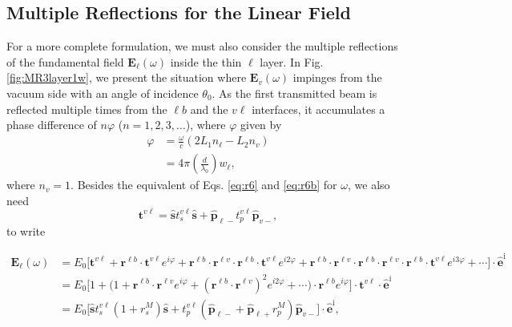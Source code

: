\documentclass[aps,prb,10pt,showpacs,letterpaper,twocolumn]{revtex4-1}
\begin{document}
\subsection{Multiple Reflections for the Linear Field}\label{sec:multiple1w}

For a more complete formulation, we must also consider the multiple reflections
of the fundamental field $\mathbf{E}_{\ell}(\omega)$ inside the thin $\ell$
layer. In Fig. \ref{fig:MR3layer1w}, we present the situation where
$\mathbf{E}_{v}(\omega)$ impinges from the vacuum side with an angle of
incidence $\theta_{0}$. As the first transmitted beam is reflected multiple
times from the $\ell b$ and the $v\ell$ interfaces, it accumulates a phase
difference of $n\varphi$ ($n=1,2,3,\ldots$), where $\varphi$ given by
\begin{equation}\label{mphi}
\begin{split}
\varphi &= \frac{\omega}{c}(2L_{1}n_{\ell} - L_{2}n_{v})\\
&= 4\pi\left(\frac{d}{\lambda_{0}}\right)w_{\ell},
\end{split}
\end{equation}
where $n_{v} = 1$. Besides the equivalent of Eqs. \eqref{eq:r6} and
\eqref{eq:r6b} for $\omega$, we also need
\begin{equation}\label{eq:mvv}
\mathbf{t}^{v\ell}
= \hat{\mathbf{s}}t_{s}^{v\ell}\hat{\mathbf{s}} 
+ \hat{\mathbf{p}}_{\ell -}t_{p}^{v\ell}\hat{\mathbf{p}}_{v-},
\end{equation}
to write
\begin{widetext}
\begin{equation}\label{eq:mcvew}
\begin{split}
\mathbf{E}_\ell(\omega)
&= E_{0}
\Big[
\mathbf{t}^{v\ell} + \mathbf{r}^{\ell b}\cdot\mathbf{t}^{v\ell}e^{i\varphi}
 + \mathbf{r}^{\ell b}\cdot\mathbf{r}^{\ell v}\cdot
   \mathbf{r}^{\ell b}\cdot\mathbf{t}^{v\ell} e^{i2\varphi}
 + \mathbf{r}^{\ell b}\cdot\mathbf{r}^{\ell v}\cdot
   \mathbf{r}^{\ell b}\cdot\mathbf{r}^{\ell v}\cdot
   \mathbf{r}^{\ell b}\cdot\mathbf{t}^{v\ell} e^{i3\varphi}
 + \cdots
\Big]\cdot\hat{\mathbf{e}}^{\mathrm{i}}\\
&= E_{0}
\Big[
1 + \Big(1 + \mathbf{r}^{\ell b}\cdot\mathbf{r}^{\ell v}e^{i\varphi}
+ (\mathbf{r}^{\ell b}\cdot\mathbf{r}^{\ell v})^2e^{i2\varphi}+\cdots\Big)\cdot
\mathbf{r}^{\ell b}e^{i\varphi}
\Big]
\cdot\mathbf{t}^{v\ell}\cdot\hat{\mathbf{e}}^{\mathrm{i}}\\
&= E_{0}
\Big[
\hat{\mathbf{s}} t^{v\ell}_{s}(1+r^{M}_{s})\hat{\mathbf{s}} 
+ t^{v\ell}_{p}
\left(\hat{\mathbf{p}}_{\ell-}+\hat{\mathbf{p}}_{\ell+}r^{M}_{p}\right)
\hat{\mathbf{p}}_{v-}
\Big]\cdot\hat{\mathbf{e}}^{\mathrm{i}},
\end{split}
\end{equation}
\end{widetext}
\end{document}
